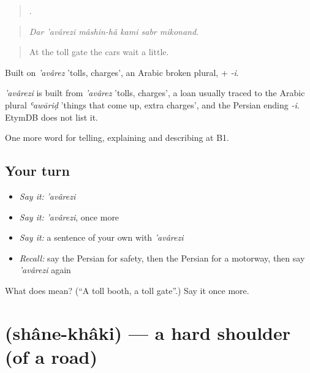 \begin{quote}
     .
\end{quote}

\begin{quote}
\emph{Dar 'avârezi mâshin-hâ kami sabr mikonand.}
\end{quote}

\begin{quote}
At the toll gate the cars wait a little.
\end{quote}

Built on \emph{'avârez} 'tolls, charges', an Arabic broken plural, + \emph{-i}.

\begin{cousinweb}
\emph{'avârezi} is built from \emph{'avârez} 'tolls, charges', a loan usually traced to the Arabic plural \emph{ʿawāriḍ} 'things that come up, extra charges', and the Persian ending \emph{-i}. EtymDB does not list it.
\end{cousinweb}

\begin{grammarlens}[title={What you've built}]
One more word for telling, explaining and describing at B1.
\end{grammarlens}

\subsection*{Your turn}
\begin{itemize}
\raggedright
  \item \emph{Say it:} \emph{'avârezi}
  \item \emph{Say it:} \emph{'avârezi}, once more
  \item \emph{Say it:} a sentence of your own with \emph{'avârezi}
  \item \emph{Recall:} say the Persian for safety, then the Persian for a motorway, then say \emph{'avârezi} again
\end{itemize}

\begin{tcolorbox}[breakable,colback=teal!4,colframe=teal!35!black,title={Before you move on}]
What does  mean? (\textquotedblleft{}A toll booth, a toll gate\textquotedblright{}.) Say it once more.
\end{tcolorbox}
\section[\texorpdfstring{\fa{شانه} \fa{خاکی} (shâne-khâki)}{شانه خاکی (shâne-khâki)}]{  (shâne-khâki) — a hard shoulder (of a road)}

